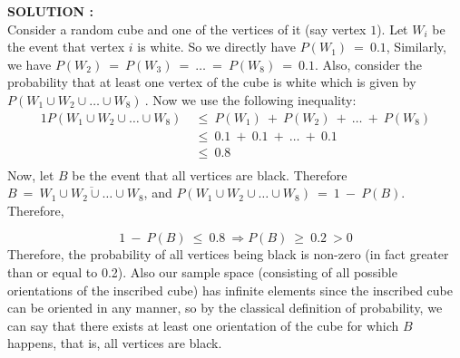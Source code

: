 \documentclass{article}
\begin{document}
\hspace{1em} \large{\textbf{SOLUTION :}} \\
Consider a random cube and one of the vertices of it (say vertex $1$). Let $W_i$ be the event that vertex $i$ is white. So we directly have $P(W_1)\ =\ 0.1$, Similarly, we have $P(W_2)\ =\ P(W_3)\ =\ \dots\ =\ P(W_8)\ =\ 0.1$. Also, consider the probability that at least one vertex of the cube is white which is given by $P(W_1\cup W_2\cup \dots \cup W_8)\ $. Now we use the following inequality:  
\begin{alignat*}{1}
    P(W_1\cup W_2\cup \dots \cup W_8)\ &\leq \ P(W_1)\ +\ P(W_2)\ +\ \dots\ +\ P(W_8)\\
                                    &\leq\ 0.1\ +\ 0.1\ +\ \dots\ +\ 0.1 \\
                                    &\leq\ 0.8\\
\end{alignat*}
Now, let $B$ be the event that all vertices are black. Therefore $B\ =\ \overline{W_1\cup W_2\cup \dots \cup W_8}$, and $P(W_1\cup W_2\cup \dots \cup W_8)\ =\ 1\ -\ P(B)$. Therefore,

\begin{equation*}
    1\ -\ P(B)\ \leq\ 0.8\ \Longrightarrow P(B)\ \geq\ 0.2\ > 0
\end{equation*}
Therefore, the probability of all vertices being black is non-zero (in fact greater than or equal to 0.2). Also our sample space (consisting of all possible orientations of the inscribed cube) has infinite elements since the inscribed cube can be oriented in any manner, so by the classical definition of probability, we can say that there exists at least one orientation of the cube for which $B$ happens, that is, all vertices are black. 
\end{document}
